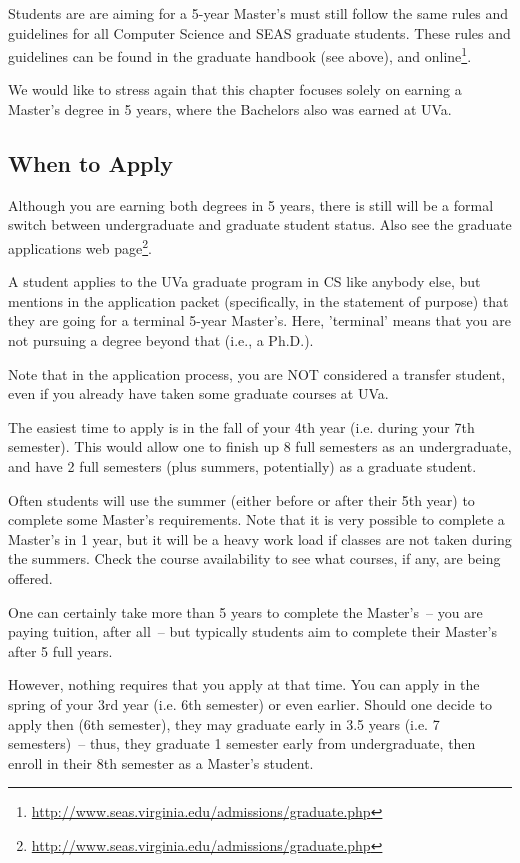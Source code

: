 \documentclass[10pt,letter]{book}
\newcommand{\myurl}[1]{\footnote{\scriptsize\url{#1}}}
\begin{document}
Students are are aiming for a 5-year Master's must still follow the
same rules and guidelines for all Computer Science and SEAS graduate
students.  These rules and guidelines can be found in the graduate
handbook (see above), and
online\myurl{http://www.seas.virginia.edu/admissions/graduate.php}.

We would like to stress again that this chapter focuses solely on
earning a Master's degree in 5 years, where the Bachelors also was
earned at UVa.


\subsection{When to Apply}

Although you are earning both degrees in 5 years, there is still will
be a formal switch between undergraduate and graduate student status.
Also see the graduate applications web
page\myurl{http://www.seas.virginia.edu/admissions/graduate.php}.

A student applies to the UVa graduate program in CS like anybody else,
but mentions in the application packet (specifically, in the statement
of purpose) that they are going for a terminal 5-year Master's.  Here,
'terminal' means that you are not pursuing a degree beyond that (i.e.,
a Ph.D.).

Note that in the application process, you are NOT considered a
transfer student, even if you already have taken some graduate courses
at UVa.

The easiest time to apply is in the fall of your 4th year (i.e. during
your 7th semester).  This would allow one to finish up 8 full
semesters as an undergraduate, and have 2 full semesters (plus
summers, potentially) as a graduate student.

Often students will use the summer (either before or after their 5th
year) to complete some Master's requirements.  Note that it is very
possible to complete a Master's in 1 year, but it will be a heavy work
load if classes are not taken during the summers.  Check the course
availability to see what courses, if any, are being offered.

One can certainly take more than 5 years to complete the Master's~--
you are paying tuition, after all~-- but typically students aim to
complete their Master's after 5 full years.

However, nothing requires that you apply at that time.  You can apply
in the spring of your 3rd year (i.e. 6th semester) or even earlier.
Should one decide to apply then (6th semester), they may graduate
early in 3.5 years (i.e. 7 semesters)~-- thus, they graduate 1
semester early from undergraduate, then enroll in their 8th semester
as a Master's student.
\end{document}
